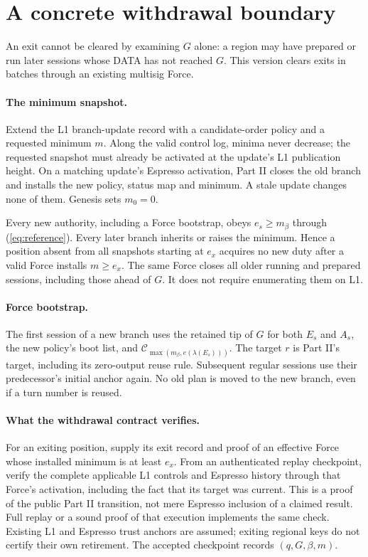 \documentclass[11pt,a4paper]{article}
\newcommand{\cfg}{\mathcal C}
\begin{document}
\newpage
\section{A concrete withdrawal boundary}
\label{sec:withdraw}
An exit cannot be cleared by examining $G$ alone: a region may have
prepared or run later sessions whose DATA has not reached $G$. This
version clears exits in batches through an existing multisig Force.

\paragraph{The minimum snapshot.}
Extend the L1 branch-update record with a candidate-order policy and a
requested minimum $m$. Along the valid control log, minima never decrease;
the requested snapshot must already be activated at the update's L1
publication height. On a matching update's Espresso activation, Part II
closes the old branch and installs the new policy, status map and minimum.
A stale update changes none of them. Genesis sets $m_0=0$.

Every new authority, including a Force bootstrap, obeys
$e_s\ge m_\beta$ through (\ref{eq:reference}). Every later branch inherits
or raises the minimum. Hence a position absent from all snapshots starting
at $e_x$ acquires no new duty after a valid Force installs $m\ge e_x$.
The same Force closes all older running and prepared sessions, including
those ahead of $G$. It does not require enumerating them on L1.

\paragraph{Force bootstrap.}
The first session of a new branch uses the retained tip of $G$ for both
$E_s$ and $A_s$, the new policy's boot list, and
$\cfg_{\max(m_\beta,e(\lambda(E_s)))}$. The target $r$ is Part II's target,
including its zero-output reuse rule. Subsequent regular sessions use
their predecessor's initial anchor again. No old plan is moved to the
new branch, even if a turn number is reused.

\paragraph{What the withdrawal contract verifies.}
For an exiting position, supply its exit record and proof of an effective
Force whose installed minimum is at least $e_x$. From an authenticated
replay checkpoint, verify the complete applicable L1 controls and
Espresso history through that Force's activation, including the fact that
its target was current. This is a proof of the public Part II transition,
not mere Espresso inclusion of a claimed result. Full replay or a sound
proof of that execution implements the same check. Existing L1 and
Espresso trust anchors are assumed; exiting regional keys do not certify
their own retirement. The accepted checkpoint records $(q,G,\beta,m)$.
\end{document}
